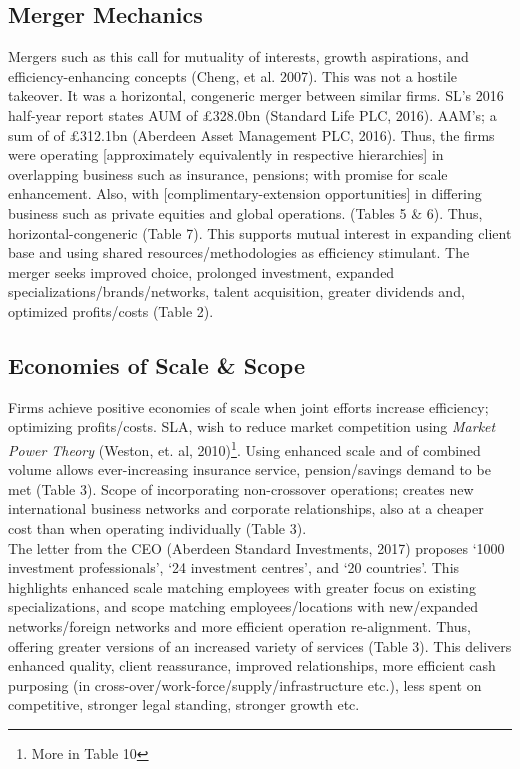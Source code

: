 \documentclass[11pt, english]{article}
\begin{document}
	\subsection{Merger Mechanics}

Mergers such as this call for mutuality of interests, growth aspirations, and efficiency-enhancing concepts (Cheng, et al. 2007). This was not a hostile takeover. It was a horizontal, congeneric merger between similar firms. SL's 2016 half-year report states AUM of \pounds328.0bn (Standard Life PLC, 2016). AAM's; a sum of of \pounds312.1bn (Aberdeen Asset Management PLC, 2016). Thus, the firms were operating [approximately equivalently in respective hierarchies] in overlapping business such as insurance, pensions; with promise for scale enhancement. Also, with [complimentary-extension opportunities] in differing business such as private equities and global operations. (Tables 5 \& 6). Thus, horizontal-congeneric (Table 7). This supports mutual interest in expanding client base and using shared resources/methodologies as efficiency stimulant. The merger seeks improved choice, prolonged investment, expanded specializations/brands/networks, talent acquisition, greater dividends and, optimized profits/costs (Table 2).

	\subsection{Economies of Scale \& Scope}

Firms achieve positive economies of scale when joint efforts increase efficiency; optimizing profits/costs. SLA, wish to reduce market competition using \textit{Market Power Theory} (Weston, et. al, 2010)\footnote{More in Table 10}. Using enhanced scale and of combined volume allows ever-increasing insurance service, pension/savings demand to be met (Table 3). Scope of incorporating non-crossover operations; creates new international business networks and corporate relationships, also at a cheaper cost than when operating individually (Table 3).\\

The letter from the CEO (Aberdeen Standard Investments, 2017) proposes `1000 investment professionals', `24 investment centres', and `20 countries'. This highlights enhanced scale matching employees with greater focus on existing specializations, and scope matching employees/locations with new/expanded networks/foreign networks and more efficient operation re-alignment. Thus, offering greater versions of an increased variety of services (Table 3). This delivers enhanced quality, client reassurance, improved relationships, more efficient cash purposing (in cross-over/work-force/supply/infrastructure etc.), less spent on competitive, stronger legal standing, stronger growth etc.
\end{document}
